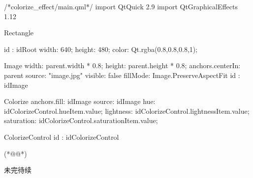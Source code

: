 \label{f000055}    %
\FloatBarrier                                  %
\begin{thebookfilesourceone}[escapeinside={(*@}{@*)},
caption=GoodLuck,
title=\filesourcenumbernameone \thefilesourcenumber
]
/*colorize_effect/main.qml*/
import QtQuick 2.9
import QtGraphicalEffects 1.12

Rectangle {

    id : idRoot
    width: 640;
    height: 480;
    color: Qt.rgba(0.8,0.8,0.8,1);

    Image{
        width: parent.width * 0.8;
        height: parent.height * 0.8;
        anchors.centerIn: parent
        source: "image.jpg"
        visible: false
        fillMode: Image.PreserveAspectFit
        id : idImage
    }

    Colorize {
        anchors.fill: idImage
        source: idImage
        hue: idColorizeControl.hueItem.value;
        lightness: idColorizeControl.lightnessItem.value;
        saturation: idColorizeControl.saturationItem.value;
    }

    ColorizeControl{
        id : idColorizeControl
    }

}(*@\marginpar[\hfill\setlength\fboxsep{2pt}\fbox{\footnotesize{\kaishu\parbox{1em}{\setlength{\baselineskip}{2pt}\filesourcenumbernameone}}\footnotesize{\thefilesourcenumber}}]{\setlength\fboxsep{2pt}\fbox{\footnotesize{\kaishu\parbox{1em}{\setlength{\baselineskip}{2pt}\filesourcenumbernameone}}\footnotesize{\thefilesourcenumber}}}@*)\end{thebookfilesourceone}          %
\addtocounter{lstlisting}{-1}   %


未完待续









